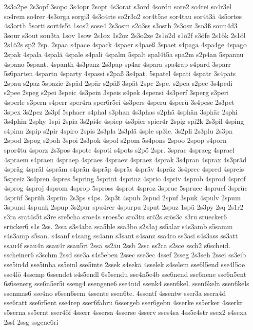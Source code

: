{2s3o2pe
2s3opf
3sopo
3s4opr
2sopt
4s3orat
s3ord
4sordn
sore2
so4rei
so4r3el
so4rem
so4rer
4s3orga
sorgi3
4s3o4rie
so2r3o2
sor4t5ae
sor4tau
sor4t3ä
4s5ortes
4s3orth
5sorti
sort4s5t
1sos2
sose4
2s3osm
s2o3ss
s3osth
2s3osz
3so3ß
soun4d3
3sour
s3out
sou3ta
1sov
1sow
2s1ox
1s2oz
2s3o2ze
2s1ö2d
s1ö2f
s3öfe
2s1ök
2s1öl
2s1ö2s
sp2
2sp.
2spaa
s4pace
4spack
4spaer
s4paeß
3spaet
s4paga
4spa4ge
4spago
2spak
4spala
4spalä
4spale
s4pali
4spalm
5spalt
spal4t5a
spa2m
s2p4an
5spannu
4spano
5spant.
4spanth
4s3panz
2s3pap
sp4ar
4spara
spa4rap
s4pard
3sparr
5s6parten
4spartn
4sparty
4spassi
s2paß
3s4pat.
5spatel
4spati
4spatr
3s4pats
2spau
s2paz
5spazie
2späd
2spär
s2päß
3spät
2spc
2spe.
s2pea
s2pec
3s4pedi
s2pee
2speg
s2pei
3speic
4s3pein
3speis
s4pek
4spensi
4s3perf
3sperg
s3peri
4sperle
s3pern
s4perr
sper4ra
sper6r5ei
4s3pers
4speru
4sperü
3s4pese
2s3pet
3spex
3s2pez
2s3pf
5sphaer
s4phal
s3phan
4s3phas
s2phä
4sphän
3sphär
2sphi
3s4phin
2sphy
1spi
2spia
3s2pi4e
4spiep
4s3pier
spier4r
2spig
spi2k
2s3pil
4sping
s4pinn
2spip
s2pir
4spiro
2spis
2s3pla
2s3plä
4sple
sp3le.
3s2pli
2s3plu
2s3pn
2spod
2spog
s2poh
3spoi
2s3pok
4spol
s2pom
5s4pons
2spoo
2spop
s4porn
spor4tu
4sporz
2s3pos
4spote
4spoti
s4pots
s2pö
2spr.
3sprac
4spraeg
4sprael
4spraem
s4praen
4spraep
4spraes
4spraev
4spraez
4sprak
3s4pran
4sprax
4s3präd
4spräg
4spräl
4spräm
s4prän
4spräp
4spräs
4spräv
4spräz
3s4prec
4spred
4spreis
5spreiz
3s4pren
4spres
5spring
5sprint
4sprinz
4sprio
4spriv
4sprob
4sprod
4sprof
4sprog
4sproj
4sprom
4sprop
5spross
4sprot
4sproz
3spruc
5spruec
4spruef
3sprüc
4sprüf
3sprüh
3sprün
2s3ps
s4ps.
2sp3t
4spub
2spud
2spuf
3spuk
4spulv
2spum
3spund
4spunk
2spup
3s2pur
spu4rer
4spurpu
2sput
2spuz
1spü
2s3py
2sq
2s1r2
s3ra
srat4s5t
s3re
sre5cha
sroe4s
sroes5c
sro3tu
srö2s
srös3c
s3ru
sruecker6
srücker6
s1s
2ss.
2ssa
s3s4aba
ssa5ble
ssa3bo
s2s3aj
ss5alar
s4s3amb
s5samm
s4s3amp
s5san.
s4sanf
s4sang
ss4ann
s3sant
s4sanz
ssa4ro
ss3asi
s4s3ass
ss3att
ssau4f
ssau4n
ssau4r
ssau5ri
2ssä
ss2äu
2ssb
2ssc
ss2ca
s2sce
ssch2
s6scheid.
sscheiner6
s3schm
2ssd
sse3a
s4s5eben
2ssec
sse3ec
4ssef
2sseg
2s3seh
2ssei
ss3eib
sse5in4d
sse5inha
ss5einl
sse5inte
2ssek
s4sekä
4sselek
s4selem
sse6l5end
sse4l5oe
sse4lö
4ssemp
6ssendet
s4s5endl
6s5sendu
sse4n5e4b
sse6nend
sse6nene
sse6n5ent
6s6senerg
sse6n5er5i
sseng4
ssengene6
sse4nid
ssenk4
ssen6kel.
ssen6keln
ssen6kels
ssenmas6
sse4no
s6sen6sem
4ssente
ssen6te.
4ssentf
4ssentw
sser3a
ssera4d
sse6ratt
sse6r5ent
sse4rep
sser6fahru
6ssergeb
sser6gebn
4sserke
ss5erker
4sserkr
s5serna
ss5ernt
sser4öf
4sserr
4ssersa
4sserse
4sserv
sses4sa
4ss5e4str
ssex2
s4sexa
2ssf
2ssg
ssgene6ri
}
